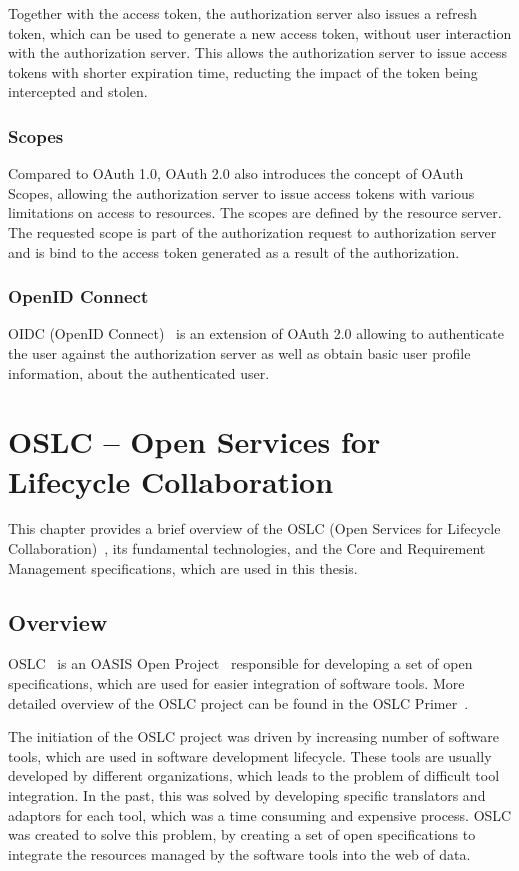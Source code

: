 Together with the access token, the authorization server also issues a refresh token, which can be used to generate a new access token, without user interaction with the authorization server. This allows the authorization server to issue access tokens with shorter expiration time, reducting the impact of the token being intercepted and stolen.

\subsection*{Scopes}
Compared to OAuth 1.0, OAuth 2.0 also introduces the concept of OAuth Scopes, allowing the authorization server to issue access tokens with various limitations on access to resources. The scopes are defined by the resource server. The requested scope is part of the authorization request to authorization server and is bind to the access token generated as a result of the authorization.

\subsection*{OpenID Connect}
OIDC (OpenID Connect) \cite{oidc} is an extension of OAuth 2.0 allowing to authenticate the user against the authorization server as well as obtain basic user profile information, about the authenticated user.


\chapter{OSLC -- Open Services for Lifecycle Collaboration}
This chapter provides a brief overview of the OSLC (Open Services for Lifecycle Collaboration) \cite{oslc}, its fundamental technologies, and the Core and Requirement Management specifications, which are used in this thesis.

\section{Overview}
OSLC \cite{oslc} is an OASIS Open Project \cite{oasis_open} responsible for developing a set of open specifications, which are used for easier integration of software tools. More detailed overview of the OSLC project can be found in the OSLC Primer \cite{oslc_primer}.

The initiation of the OSLC project was driven by increasing number of software tools, which are used in software development lifecycle. These tools are usually developed by different organizations, which leads to the problem of difficult tool integration. In the past, this was solved by developing specific translators and adaptors for each tool, which was a time consuming and expensive process. OSLC was created to solve this problem, by creating a set of open specifications to integrate the resources managed by the software tools into the web of data.

